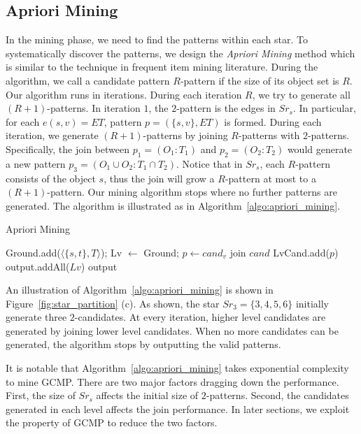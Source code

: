 \subsection{Apriori Mining}
In the mining phase, we need to find the patterns within each star. 
To systematically discover the patterns, we design the \emph{Apriori Mining} method which
is similar to the technique in frequent item mining literature. During the algorithm, we call a candidate pattern $R$-pattern if the size of its object set is $R$. 
Our algorithm runs in iterations. During each iteration $R$, we try to generate all $(R+1)$-patterns. In iteration $1$, the $2$-pattern is the edges in $Sr_s$. In particular,
for each $e(s,v)=ET$, pattern $p=(\{s,v\}, ET)$ is formed. During each iteration, 
we generate $(R+1)$-patterns by joining $R$-patterns with $2$-patterns. Specifically,
the join between $p_1=(O_1:T_1)$ and $p_2=(O_2:T_2)$ would generate a new pattern $p_3=(O_1 \cup O_2:T_1 \cap T_2)$. Notice that in $Sr_s$, each $R$-pattern consists of the object $s$, thus the join will grow a $R$-pattern at most to a $(R+1)$-pattern.
Our mining algorithm stops where no further patterns are generated. The algorithm is illustrated as in Algorithm~\ref{algo:apriori_mining}.

\begin{algorithm}
\caption{Apriori Mining}
\label{algo:apriori_mining}
\begin{algorithmic}[1]
\State Ground.add($\langle \{s,t\}, T \rangle$);
\State Lv $\gets$ Ground;
\EndFor
{}
				\State $p \gets cand_v$ join $cand$
					\State LvCand.add($p$)
				\EndIf
			\EndFor
		\EndFor
		\EndIf
	\Else
	\EndIf
\EndWhile
\State output.addAll($Lv$)
\State \Return output
\end{algorithmic}
\end{algorithm}

An illustration of Algorithm~\ref{algo:apriori_mining} is shown in Figure~\ref{fig:star_partition} (c).
As shown, the star $Sr_3=\{3,4,5,6\}$ initially generate three $2$-candidates. At every iteration, 
higher level candidates are generated by joining lower level candidates. When no more candidates 
can be generated, the algorithm stops by outputting the valid patterns.

It is notable that Algorithm~\ref{algo:apriori_mining} takes exponential complexity to mine GCMP. There
are two major factors dragging down the performance. First, the size of $Sr_s$ affects
the initial size of $2$-patterns. Second, the candidates generated in each level affects the join performance. In later
sections, we exploit the property of GCMP to reduce the two factors.

